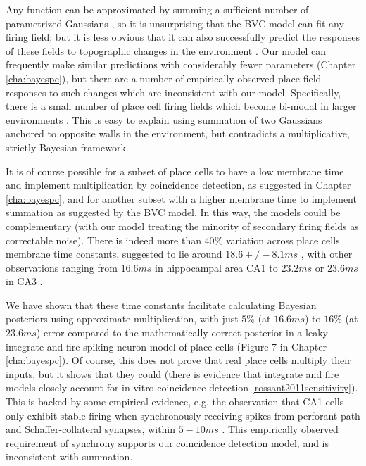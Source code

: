 Any function can be approximated by summing a sufficient number of parametrized Gaussians \citep{parzen1962estimation}, so it is unsurprising that the BVC model can fit any firing field; but it is less obvious that it can also successfully predict the responses of these fields to topographic changes in the environment \citep{barry2006boundary}. Our model can frequently make similar predictions with considerably fewer parameters (Chapter \ref{cha:bayespc}), but there are a number of empirically observed place field responses to such changes which are inconsistent with our model. Specifically, there is a small number of place cell firing fields which become bi-modal in larger environments \citep{okeefe1996geometric}. This is easy to explain using summation of two Gaussians anchored to opposite walls in the environment, but contradicts a multiplicative, strictly Bayesian framework.

It is of course possible for a subset of place cells to have a low membrane time and implement multiplication by coincidence detection, as suggested in Chapter \ref{cha:bayespc}, and for another subset with a higher membrane time to implement summation as suggested by the BVC model. In this way, the models could be complementary (with our model treating the minority of secondary firing fields as correctable noise). There is indeed more than $40\%$ variation across place cells membrane time constants, suggested to lie around $18.6 +/- 8.1 ms$ \citep{szilagyi1996physiological}, with other observations ranging from $16.6 ms$ in hippocampal area CA1 \citep{zemankovics2010differences} to $23.2ms$ or $23.6ms$ in CA3 \citep{johnston1981passive}. 

We have shown that these time constants facilitate calculating Bayesian posteriors using approximate multiplication, with just $5 \%$ (at $16.6 ms$) to $16 \%$ (at $23.6 ms$) error compared to the mathematically correct posterior in a leaky integrate-and-fire spiking neuron model of place cells (Figure 7 in Chapter \ref{cha:bayespc}). Of course, this does not prove that real place cells multiply their inputs, but it shows that they could (there is evidence that integrate and fire models closely account for in vitro coincidence detection \ref{rossant2011sensitivity}). This is backed by some empirical evidence, e.g. the observation that CA1 cells only exhibit stable firing when synchronously receiving spikes from perforant path and Schaffer-collateral synapses, within $5-10ms$ \citep{jarsky2005conditional}. This empirically observed requirement of synchrony supports our coincidence detection model, and is inconsistent with summation. 

